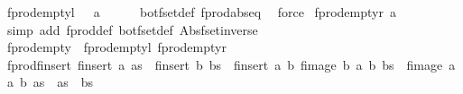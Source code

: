 \begin{isabellebody}
{\isafoldproof}%
%
\isadelimproof
\isanewline
%
\endisadelimproof
\isanewline
{}\isamarkupfalse%
\ fprod{\isacharunderscore}empty{\isacharunderscore}l{\isacharcolon}\ {\isachardoublequoteopen}{\isacharbraceleft}{\isacharbar}{\isacharbar}{\isacharbraceright}\ {\isacharbar}{\isasymtimes}{\isacharbar}\ a\ {\isacharequal}\ {\isacharbraceleft}{\isacharbar}{\isacharbar}{\isacharbraceright}{\isachardoublequoteclose}\isanewline
%
\isadelimproof
\ \ %
\endisadelimproof
%
\isatagproof
{}\isamarkupfalse%
\ bot{\isacharunderscore}fset{\isacharunderscore}def\ fprod{\isachardot}abs{\isacharunderscore}eq\ \isamarkupfalse%
\ force%
\endisatagproof
{\isafoldproof}%
%
\isadelimproof
\isanewline
%
\endisadelimproof
\isanewline
{}\isamarkupfalse%
\ fprod{\isacharunderscore}empty{\isacharunderscore}r{\isacharcolon}\ {\isachardoublequoteopen}a\ {\isacharbar}{\isasymtimes}{\isacharbar}\ {\isacharbraceleft}{\isacharbar}{\isacharbar}{\isacharbraceright}\ {\isacharequal}\ {\isacharbraceleft}{\isacharbar}{\isacharbar}{\isacharbraceright}{\isachardoublequoteclose}\isanewline
%
\isadelimproof
\ \ %
\endisadelimproof
%
\isatagproof
{}\isamarkupfalse%
\ {\isacharparenleft}simp\ add{\isacharcolon}\ fprod{\isacharunderscore}def\ bot{\isacharunderscore}fset{\isacharunderscore}def\ Abs{\isacharunderscore}fset{\isacharunderscore}inverse{\isacharparenright}%
\endisatagproof
{\isafoldproof}%
%
\isadelimproof
\isanewline
%
\endisadelimproof
\isanewline
{}\isamarkupfalse%
\ fprod{\isacharunderscore}empty\ {\isacharequal}\ fprod{\isacharunderscore}empty{\isacharunderscore}l\ fprod{\isacharunderscore}empty{\isacharunderscore}r\isanewline
\isanewline
{}\isamarkupfalse%
\ fprod{\isacharunderscore}finsert{\isacharcolon}\ {\isachardoublequoteopen}{\isacharparenleft}finsert\ a\ as{\isacharparenright}\ {\isacharbar}{\isasymtimes}{\isacharbar}\ {\isacharparenleft}finsert\ b\ bs{\isacharparenright}\ {\isacharequal}\ finsert\ {\isacharparenleft}a{\isacharcomma}\ b{\isacharparenright}\ {\isacharparenleft}fimage\ {\isacharparenleft}{\isasymlambda}b{\isachardot}\ {\isacharparenleft}a{\isacharcomma}\ b{\isacharparenright}{\isacharparenright}\ bs\ {\isacharbar}{\isasymunion}{\isacharbar}\ fimage\ {\isacharparenleft}{\isasymlambda}a{\isachardot}\ {\isacharparenleft}a{\isacharcomma}\ b{\isacharparenright}{\isacharparenright}\ as\ {\isacharbar}{\isasymunion}{\isacharbar}\ {\isacharparenleft}as\ {\isacharbar}{\isasymtimes}{\isacharbar}\ bs{\isacharparenright}{\isacharparenright}{\isachardoublequoteclose}\isanewline

\end{isabellebody}
